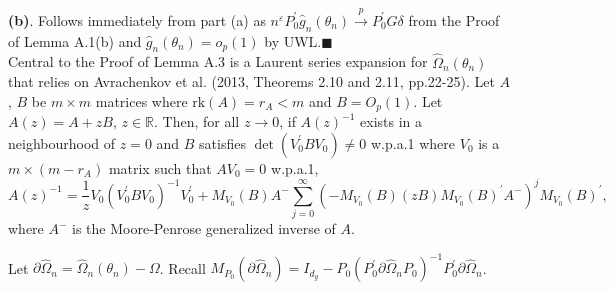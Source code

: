\documentclass[hidelinks, 11 pt, a4paper, pdflatex]{article}
\begin{document}
{  \textbf{(b)}. Follows immediately from part (a) as $n^{\varepsilon}P_{0}^{\prime}\hat{g}_{n}(\theta_{n}) \overset{p}{\rightarrow} P_{0}^{\prime}G\delta$ from the Proof of Lemma A.1(b) and $\hat{g}_{n}(\theta_{n}) = o_{p}(1)$ by UWL.$\blacksquare$ \\

  Central to the Proof of Lemma A.3 is a Laurent series expansion for $\hat{\Omega}_{n}(\theta_{n})$ that relies on Avrachenkov et al. (2013, Theorems 2.10 and 2.11, pp.22-25). Let $A$, $B$ be $m \times m$ matrices where $\textrm{rk}(A) = r_{A} < m$ and $B = O_{p}(1)$. Let $A(z) = A + zB$, $z \in \mathbb{R}$. Then, for all $z \rightarrow 0$, if $A(z)^{-1}$ exists in a neighbourhood of $z = 0$ and $B$ satisfies $\det(V_{0}^{\prime}BV_{0}) \neq 0$ w.p.a.1 where $V_{0}$ is a $m \times (m - r_{A})$ matrix such that $AV_{0} = 0$ w.p.a.1,
   \[
    A(z)^{-1} = \frac{1}{z} V_{0}(V_{0}^{\prime}BV_{0})^{-1}V_{0}^{\prime}
                 + M_{V_{0}}(B)A^{-} \sum_{j=0}^{\infty} (-M_{V_{0}}(B)(zB)M_{V_{0}}(B)^{\prime}A^{-})^{j}M_{V_{0}}(B)^{\prime},
   \]
  where $A^{-}$ is the Moore-Penrose generalized inverse of $A$.

  Let $\partial \hat{\Omega}_{n} = \hat{\Omega}_{n}(\theta _{n}) - \Omega $. Recall $M_{P_{0}}(\partial \hat{\Omega}_{n}) = I_{d_{g}} - P_{0}(P_{0}^{\prime} \partial \hat{\Omega}_{n}P_{0})^{-1} P_{0}^{\prime} \partial \hat{\Omega}_{n}$.

}
\end{document}
